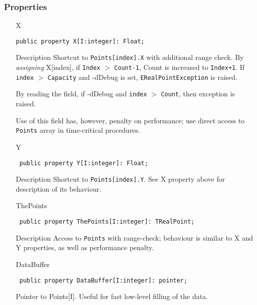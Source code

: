 \documentclass[12pt,a4paper,oneside]{report}
\newcommand{\descriptiontitle}[1]{{\addfontfeatures{FakeSlant}#1}}
\newcommand{\inlineitem}[1]{{\addfontfeatures{FakeBold} #1}}
\newcommand{\code}[1]{\texttt{#1}}
\begin{document}
\subsubsection{Properties}
\begin{itemize}
	\item[\inlineitem{X}\hfill]
	\begin{flushleft}
		\code{public property X[I:integer]: Float;}
	\end{flushleft}
	\item[\descriptiontitle{Description}]
	Shortcut to \code{Points[index].X} with additional range check. By \textit{assigning} X[index], if  \code{Index} $>$ \code{Count-1}, Count is increased to \code{Index+1}. If \code{index} $>$ \code{Capacity} and -dDebug is set, \code{ERealPointException} is raised. 
	
	By reading the field, if -dDebug and \code{index} $>$ \code{Count}, then exception is raised.
	
	Use of this field has, however, penalty on performance; use direct access to \code{Points} array in time-critical procedures. 
	\par  \label{lmPointsVec.TPoints-Y}
	\item[\inlineitem{Y}\hfill]
	\begin{flushleft}
		\code{
			public property Y[I:integer]: Float;}
	\end{flushleft}
	\item[\descriptiontitle{Description}]
	Shortcut to \code{Points[index].Y}. See X property above for description of its behaviour. 
	\par  \label{lmPointsVec.TPoints-ThePoints}
	\item[\inlineitem{ThePoints}\hfill]
	\begin{flushleft}
		\code{
			public property ThePoints[I:integer]: TRealPoint;}
	\end{flushleft}
	\item[\descriptiontitle{Description}]
	Access to \code{Points} with range-check; behaviour is similar to X and Y properties, as well as performance penalty.
	\par  \label{lmPointsVec.TPoints-DataBuffer}
	\item[\inlineitem{DataBuffer}\hfill]
	\begin{flushleft}
		\code{
			public property DataBuffer[I:integer]: pointer;}
	\end{flushleft}
	Pointer to Points[I]. Useful for fast low-level filling of the data.
\end{itemize}
	
\end{document}
